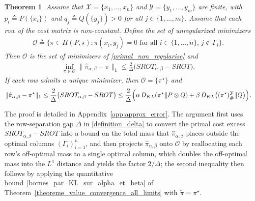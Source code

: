 \documentclass{article}
\newtheorem{theorem}{Theorem}[section]
\begin{document}
\begin{theorem}
  \label{theoreme_l1_control_discrete}
  Assume that $\mathcal{X} = \{x_1,\dots,x_n\}$ and $\mathcal{Y} = \{y_1,\dots,y_m\}$
  are finite, with $p_i \triangleq P(\{x_i\})$ and $q_j \triangleq Q(\{y_j\}) > 0$ for
  all $j \in \{1,\dots,m\}$. Assume that each row of the cost matrix is non-constant. Define the
  set of unregularized minimizers
  \begin{align}
    \mathcal{O}
    \triangleq
    \bigl\{
      \pi \in \Pi(P,\star)
      :
      \pi(x_i, y_j) = 0
      \text{ for all } i \in \{1,\dots,n\},\, j \notin \Gamma_i
    \bigr\}.
  \end{align}
  Then $\mathcal{O}$ is the set of minimizers of \eqref{primal_non_regularise} and
  \begin{align}
    \inf_{\pi\in\mathcal{O}}
    \|\hat\pi_{\alpha,\beta} - \pi\|_1
    \leq
    \frac{2}{\Delta}
    \bigl(SROT_{\alpha,\beta} - SROT\bigr).
  \end{align}
  If each row admits a unique minimizer, then $\mathcal{O} = \{\pi^\star\}$ and
  \begin{align}
    \|\hat\pi_{\alpha,\beta} - \pi^\star\|_1
    \leq
    \frac{2}{\Delta}
    \bigl(SROT_{\alpha,\beta} - SROT\bigr)
    \leq
    \frac{2}{\Delta}
    \Bigl(
      \alpha\, D_{KL}(\pi^\star \| P\otimes Q)
      +
      \beta\, D_{KL}\bigl((\pi^\star)_{\#}^{\mathcal{Y}} \| Q\bigr)
    \Bigr).
  \end{align}
\end{theorem}
The proof is detailed in Appendix~\ref{app:approx_error}. The argument first uses the row-separation gap $\Delta$ in \eqref{definition_delta} to convert the primal cost excess $SROT_{\alpha,\beta} - SROT$ into a bound on the total mass that $\hat\pi_{\alpha,\beta}$ places outside the optimal columns $(\Gamma_i)_{i=1}^n$, and then projects $\hat\pi_{\alpha,\beta}$ onto $\mathcal{O}$ by reallocating each row's off-optimal mass to a single optimal column, which doubles the off-optimal mass into the $L^1$ distance and yields the factor $2/\Delta$; the second inequality then follows by applying the quantitative bound~\eqref{bornes_par_KL_sur_alpha_et_beta} of Theorem~\ref{theoreme_value_convergence_all_limits} with $\tilde\pi = \pi^\star$.
\end{document}
